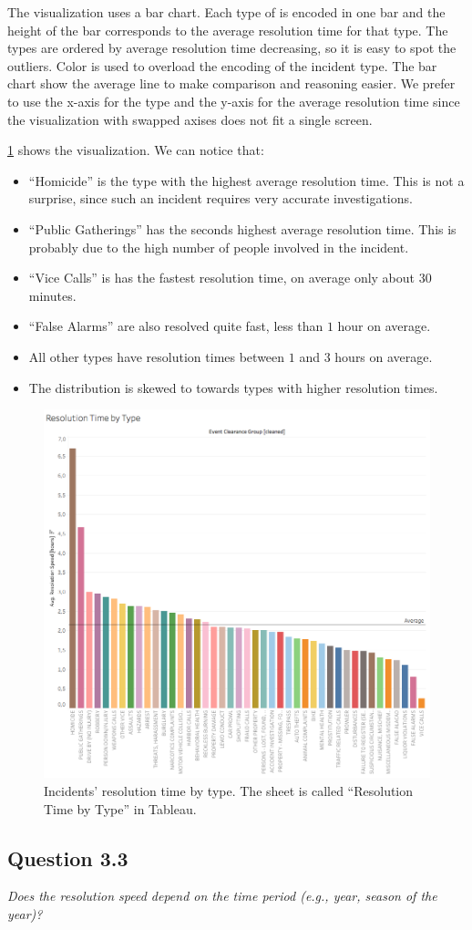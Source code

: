 The visualization uses a bar chart.
Each type of is encoded in one bar and the height of the bar corresponds to the average resolution time for that type.
The types are ordered by average resolution time decreasing, so it is easy to spot the outliers.
Color is used to overload the encoding of the incident type.
The bar chart show the average line to make comparison and reasoning easier.
We prefer to use the x-axis for the type and the y-axis for the average resolution time since the visualization with swapped axises does not fit a single screen.

\cref{fig:3_2_resolution_speed_by_type} shows the visualization.
We can notice that:
\begin{itemize}
    \item ``Homicide'' is the type with the highest average resolution time. This is not a surprise, since such an incident requires very accurate investigations.
    \item ``Public Gatherings'' has the seconds highest average resolution time. This is probably due to the high number of people involved in the incident.
    \item ``Vice Calls'' is has the fastest resolution time, on average only about $30$ minutes.
    \item ``False Alarms'' are also resolved quite fast, less than $1$ hour on average.
    \item All other types have resolution times between $1$ and $3$ hours on average.
    \item The distribution is skewed to towards types with higher resolution times.
\end{itemize}

\begin{figure}[h]
	\centering
	\includegraphics[width=\columnwidth]{figures/3_2_resolution_speed_by_type}
	\caption{Incidents' resolution time by type. The sheet is called ``Resolution Time by Type'' in Tableau.}
	\label{fig:3_2_resolution_speed_by_type}
\end{figure}


\subsection*{Question 3.3}
\textit{Does the resolution speed depend on the time period (e.g., year, season of the year)?}
